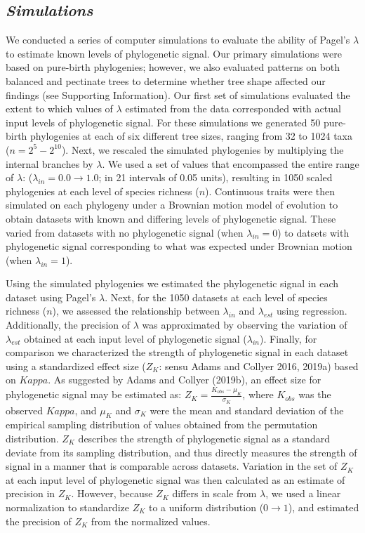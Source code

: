 \documentclass[
]{article}
\begin{document}
\hypertarget{simulations}{%
\subsection{\texorpdfstring{\emph{Simulations}}{Simulations}}\label{simulations}}

We conducted a series of computer simulations to evaluate the ability of
Pagel's \(\lambda\) to estimate known levels of phylogenetic signal. Our
primary simulations were based on pure-birth phylogenies; however, we
also evaluated patterns on both balanced and pectinate trees to
determine whether tree shape affected our findings (see Supporting
Information). Our first set of simulations evaluated the extent to which
values of \(\lambda\) estimated from the data corresponded with actual
input levels of phylogenetic signal. For these simulations we generated
50 pure-birth phylogenies at each of six different tree sizes, ranging
from 32 to 1024 taxa (\(n=2^5 - 2^{10}\)). Next, we rescaled the
simulated phylogenies by multiplying the internal branches by
\(\lambda\). We used a set of values that encompassed the entire range
of \(\lambda\): (\(\lambda_{in} = 0.0 \to 1.0\); in 21 intervals of 0.05
units), resulting in 1050 scaled phylogenies at each level of species
richness (\(n\)). Continuous traits were then simulated on each
phylogeny under a Brownian motion model of evolution to obtain datasets
with known and differing levels of phylogenetic signal. These varied
from datasets with no phylogenetic signal (when \(\lambda_{in} =0\)) to
datsets with phylogenetic signal corresponding to what was expected
under Brownian motion (when \(\lambda_{in} =1\)). \hfill\break

Using the simulated phylogenies we estimated the phylogenetic signal in
each dataset using Pagel's \(\lambda\). Next, for the 1050 datasets at
each level of species richness (\(n\)), we assessed the relationship
between \(\lambda_{in}\) and \(\lambda_{est}\) using regression.
Additionally, the precision of \(\lambda\) was approximated by observing
the variation of \(\lambda_{est}\) obtained at each input level of
phylogenetic signal (\(\lambda_{in}\)). Finally, for comparison we
characterized the strength of phylogenetic signal in each dataset using
a standardized effect size (\(Z_K\): sensu Adams and Collyer 2016,
2019a) based on \(Kappa\). As suggested by Adams and Collyer (2019b), an
effect size for phylogenetic signal may be estimated as:
\(Z_K=\frac{K_{obs}-\mu_K}{\sigma_K}\), where \(K_{obs}\) was the
observed \(Kappa\), and \(\mu_K\) and \(\sigma_K\) were the mean and
standard deviation of the empirical sampling distribution of values
obtained from the permutation distribution. \(Z_K\) describes the
strength of phylogenetic signal as a standard deviate from its sampling
distribution, and thus directly measures the strength of signal in a
manner that is comparable across datasets. Variation in the set of
\(Z_K\) at each input level of phylogenetic signal was then calculated
as an estimate of precision in \(Z_K\). However, because \(Z_K\) differs
in scale from \(\lambda\), we used a linear normalization to standardize
\(Z_K\) to a uniform distribution (\(0\rightarrow1\)), and estimated the
precision of \(Z_K\) from the normalized values. \hfill\break
\end{document}

